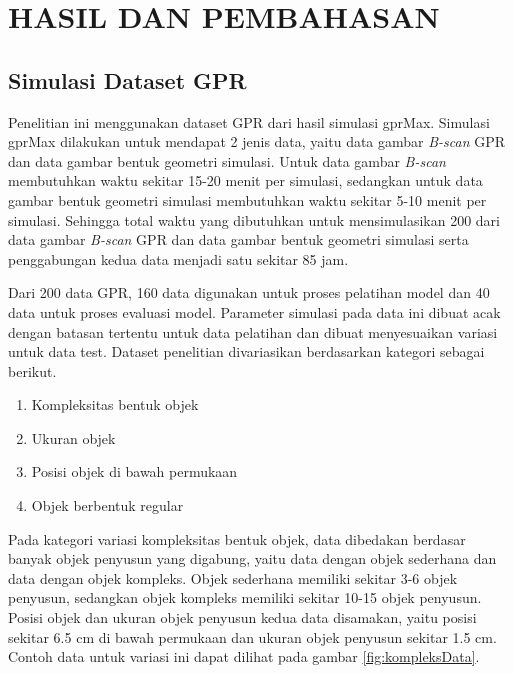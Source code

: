 \chapter{HASIL DAN PEMBAHASAN}
\label{chap:hasilpembahasan}

\section{Simulasi Dataset GPR}
\label{sec:simulasiDatasetGPR}

Penelitian ini menggunakan dataset GPR dari hasil simulasi gprMax. 
Simulasi gprMax dilakukan untuk mendapat 2 jenis data, yaitu data gambar \emph{B-scan} GPR dan data gambar bentuk geometri simulasi. 
Untuk data gambar \emph{B-scan} membutuhkan waktu sekitar 15-20 menit per simulasi, sedangkan untuk data gambar bentuk geometri simulasi membutuhkan waktu sekitar 5-10 menit per simulasi. 
Sehingga total waktu yang dibutuhkan untuk mensimulasikan 200 dari data gambar \emph{B-scan} GPR dan data gambar bentuk geometri simulasi serta penggabungan kedua data menjadi satu sekitar 85 jam.

Dari 200 data GPR, 160 data digunakan untuk proses pelatihan model dan 40 data untuk proses evaluasi model. 
Parameter simulasi pada data ini dibuat acak dengan batasan tertentu untuk data pelatihan dan dibuat menyesuaikan variasi untuk data test. 
Dataset penelitian divariasikan berdasarkan kategori sebagai berikut.

\begin{enumerate}[nolistsep]

  \item Kompleksitas bentuk objek

  \item Ukuran objek
  
  \item Posisi objek di bawah permukaan

  \item Objek berbentuk regular
\end{enumerate}

Pada kategori variasi kompleksitas bentuk objek, data dibedakan berdasar banyak objek penyusun yang digabung, yaitu data dengan objek sederhana dan data dengan objek kompleks. 
Objek sederhana memiliki sekitar 3-6 objek penyusun, sedangkan objek kompleks memiliki sekitar 10-15 objek penyusun. 
Posisi objek dan ukuran objek penyusun kedua data disamakan, yaitu posisi sekitar 6.5 cm di bawah permukaan dan ukuran objek penyusun sekitar 1.5 cm. 
Contoh data untuk variasi ini dapat dilihat pada gambar \ref{fig:kompleksData}.

